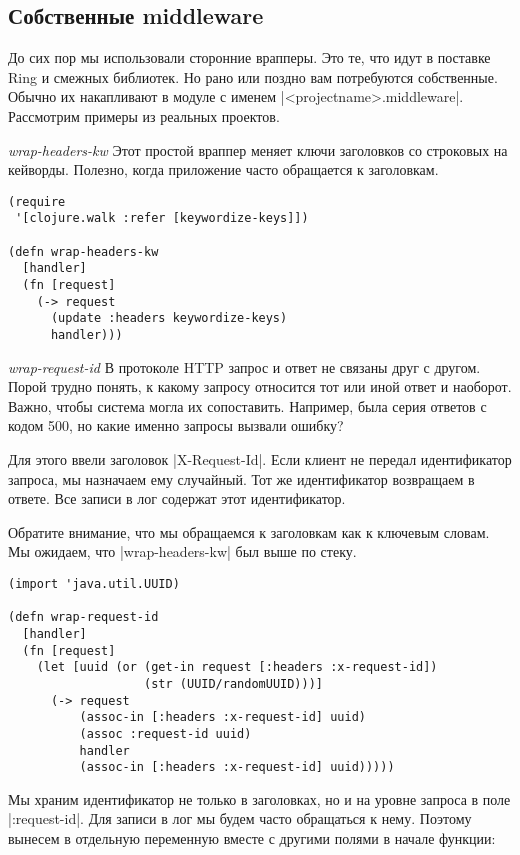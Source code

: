 \subsection{Собственные middleware}

До сих пор мы использовали сторонние врапперы. Это те, что идут в поставке Ring
и смежных библиотек. Но рано или поздно вам потребуются собственные. Обычно их
накапливают в модуле с именем \spverb|<projectname>.middleware|. Рассмотрим примеры из
реальных проектов.

\emph{wrap-headers-kw} Этот простой враппер меняет ключи заголовков со строковых
на кейворды. Полезно, когда приложение часто обращается к заголовкам.

\begin{verbatim}
(require
 '[clojure.walk :refer [keywordize-keys]])

(defn wrap-headers-kw
  [handler]
  (fn [request]
    (-> request
      (update :headers keywordize-keys)
      handler)))
\end{verbatim}



\emph{wrap-request-id} В протоколе HTTP запрос и ответ не связаны друг с
другом. Порой трудно понять, к какому запросу относится тот или иной ответ и
наоборот. Важно, чтобы система могла их сопоставить. Например, была серия
ответов с кодом 500, но какие именно запросы вызвали ошибку?

Для этого ввели заголовок \spverb|X-Request-Id|. Если клиент не передал идентификатор
запроса, мы назначаем ему случайный. Тот же идентификатор возвращаем в
ответе. Все записи в лог содержат этот идентификатор.

Обратите внимание, что мы обращаемся к заголовкам как к ключевым словам. Мы
ожидаем, что \spverb|wrap-headers-kw| был выше по стеку.

\begin{verbatim}
(import 'java.util.UUID)

(defn wrap-request-id
  [handler]
  (fn [request]
    (let [uuid (or (get-in request [:headers :x-request-id])
                   (str (UUID/randomUUID)))]
      (-> request
          (assoc-in [:headers :x-request-id] uuid)
          (assoc :request-id uuid)
          handler
          (assoc-in [:headers :x-request-id] uuid)))))
\end{verbatim}

Мы храним идентификатор не только в заголовках, но и на уровне запроса в поле
\spverb|:request-id|. Для записи в лог мы будем часто обращаться к нему. Поэтому
вынесем в отдельную переменную вместе с другими полями в начале функции:

